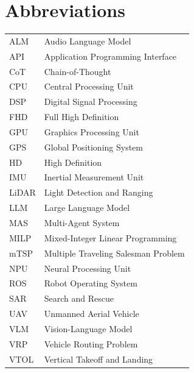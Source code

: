 \chapter*{Abbreviations}
\begin{tabular}{ll}
ALM & Audio Language Model \\
API & Application Programming Interface \\
CoT & Chain-of-Thought \\
CPU & Central Processing Unit \\
DSP & Digital Signal Processing \\
FHD & Full High Definition \\
GPU & Graphics Processing Unit \\
GPS & Global Positioning System \\
HD & High Definition \\
IMU & Inertial Measurement Unit \\
LiDAR & Light Detection and Ranging \\
LLM & Large Language Model \\
MAS & Multi-Agent System \\
MILP & Mixed-Integer Linear Programming \\
mTSP & Multiple Traveling Salesman Problem \\
NPU & Neural Processing Unit \\
ROS & Robot Operating System \\
SAR & Search and Rescue \\
UAV & Unmanned Aerial Vehicle \\
VLM & Vision-Language Model \\
VRP & Vehicle Routing Problem \\
VTOL & Vertical Takeoff and Landing
\end{tabular}